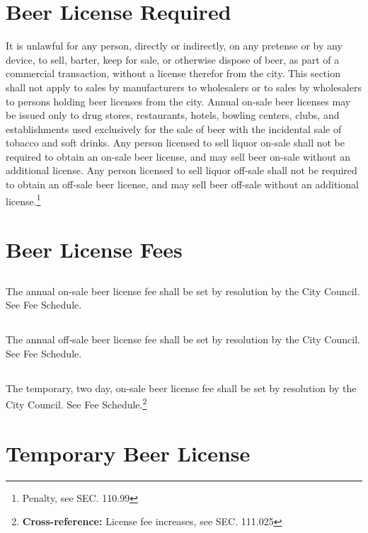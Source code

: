 \section{Beer License Required}
It is unlawful for any person, directly or indirectly, on any pretense or by any device, to sell, barter, keep for sale, or otherwise dispose of beer, as part of a commercial transaction, without a license therefor from the city. This section shall not apply to sales by manufacturers to wholesalers or to sales by wholesalers to persons holding beer licenses from the city.  Annual on-sale beer licenses may be issued only to drug stores, restaurants, hotels, bowling centers, clubs, and establishments used exclusively for the sale of beer with the incidental sale of tobacco and soft drinks.  Any person licensed to sell liquor on-sale shall not be required to obtain an on-sale beer license, and may sell beer on-sale without an additional license.  Any person licensed to sell liquor off-sale shall not be required to obtain an off-sale beer license, and may sell beer off-sale without an additional license.\footnote{Penalty, see SEC. 110.99}

\section{Beer License Fees}
\subsection{}
The annual on-sale beer license fee shall be set by resolution by the City Council. See Fee Schedule.
\subsection{}
The annual off-sale beer license fee shall be set by resolution by the City Council. See Fee Schedule.
\subsection{}
The temporary, two day, on-sale beer license fee shall be set by resolution by the City Council. See Fee Schedule.\footnote{\textbf{Cross-reference:} License fee increases, see SEC. 111.025}

\section{Temporary Beer License}

